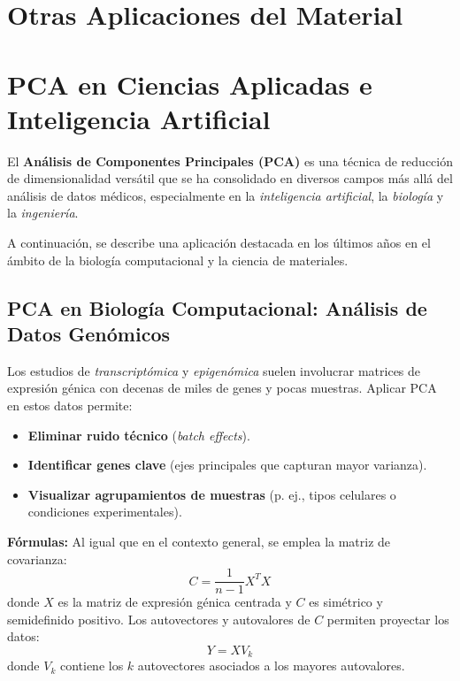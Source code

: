 \documentclass[12pt]{article}
\begin{document}
        \newpage
        \section{Otras Aplicaciones del Material}
        \section*{PCA en Ciencias Aplicadas e Inteligencia Artificial}
        \noindent
        El \textbf{Análisis de Componentes Principales (PCA)} es una técnica de reducción de dimensionalidad versátil que se ha consolidado en diversos campos más allá del análisis de datos médicos, especialmente en la \emph{inteligencia artificial}, la \emph{biología} y la \emph{ingeniería}.
        
        \vspace{1em}
        \noindent
        A continuación, se describe una aplicación destacada en los últimos años en el ámbito de la biología computacional y la ciencia de materiales.
        
        \subsection*{PCA en Biología Computacional: Análisis de Datos Genómicos}
        \noindent
        Los estudios de \emph{transcriptómica} y \emph{epigenómica} suelen involucrar matrices de expresión génica con decenas de miles de genes y pocas muestras. Aplicar PCA en estos datos permite:
        \begin{itemize}
                \item \textbf{Eliminar ruido técnico} (\emph{batch effects}).
                \item \textbf{Identificar genes clave} (ejes principales que capturan mayor varianza).
                \item \textbf{Visualizar agrupamientos de muestras} (p. ej., tipos celulares o condiciones experimentales).
        \end{itemize}
        
        \vspace{1em}
        \noindent
        \textbf{Fórmulas:} Al igual que en el contexto general, se emplea la matriz de covarianza:
        \[
        C = \frac{1}{n-1} X^T X
        \]
        donde $ X $ es la matriz de expresión génica centrada y $ C $ es simétrico y semidefinido positivo. Los autovectores y autovalores de $ C $ permiten proyectar los datos:
        \[
        Y = X V_k
        \]
        donde $ V_k $ contiene los $ k $ autovectores asociados a los mayores autovalores.
        
\end{document}
